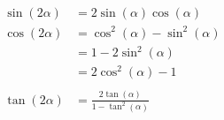 \begin{equation}
\begin{split}
    \sin(2\alpha) &= 2\sin(\alpha)\cos(\alpha) \\
    \cos(2\alpha) &= \cos^2(\alpha) - \sin^2(\alpha) \\
                  &= 1 - 2\sin^2(\alpha) \\
                  &= 2\cos^2(\alpha) - 1 \\
    &\\
    \tan(2\alpha) &= \frac{2\tan(\alpha)}{1 - \tan^2(\alpha)}
\end{split}
\end{equation}